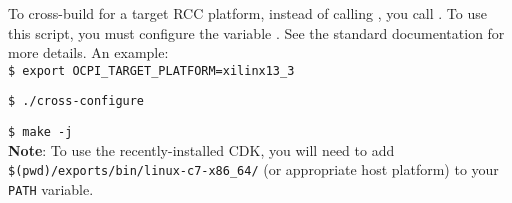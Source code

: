 \begin{appendices}
To cross-build for a target RCC platform, instead of calling , you call . To use this script, you must configure the variable . See the standard documentation for more details. An example:\\

\verb+$ export OCPI_TARGET_PLATFORM=xilinx13_3+

\verb+$ ./cross-configure+

\verb+$ make -j+\\

\textbf{Note}: To use the recently-installed CDK, you will need to add \verb+$(pwd)/exports/bin/linux-c7-x86_64/+ (or appropriate host platform) to your \verb+PATH+ variable.

\end{appendices}

